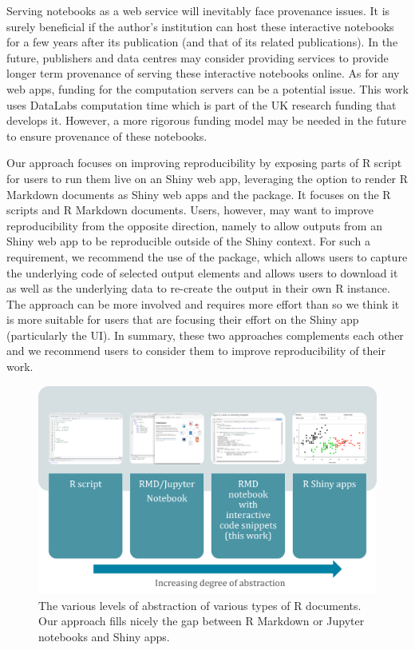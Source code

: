Serving notebooks as a web service will inevitably face provenance
issues. It is surely beneficial if the author's institution can host
these interactive notebooks for a few years after its publication (and
that of its related publications). In the future, publishers and data
centres may consider providing services to provide longer term
provenance of serving these interactive notebooks online. As for any web
apps, funding for the computation servers can be a potential issue. This
work uses DataLabs computation time which is part of the UK research
funding that develops it. However, a more rigorous funding model may be
needed in the future to ensure provenance of these notebooks.

Our approach focuses on improving reproducibility by exposing parts of R
script for users to run them live on an Shiny web app, leveraging the
option to render R Markdown documents as Shiny web apps and the
 package. It focuses on the R scripts and R Markdown
documents. Users, however, may want to improve reproducibility from the
opposite direction, namely to allow outputs from an Shiny web app to be
reproducible outside of the Shiny context. For such a requirement, we
recommend the use of the  \citep{shinymeta} package,
which allows users to capture the underlying code of selected output
elements and allows users to download it as well as the underlying data
to re-create the output in their own R instance. The 
approach can be more involved and requires more effort than
 so we think it is more suitable for users that are
focusing their effort on the Shiny app (particularly the UI). In
summary, these two approaches complements each other and we recommend
users to consider them to improve reproducibility of their work.

\begin{Schunk}
\begin{figure}
\includegraphics[width=\textwidth]{learnr_abstraction} \caption[The various levels of abstraction of various types of R documents]{The various levels of abstraction of various types of R documents. Our approach fills nicely the gap between R Markdown or Jupyter notebooks and Shiny apps.}\label{fig:fig1}
\end{figure}
\end{Schunk}

